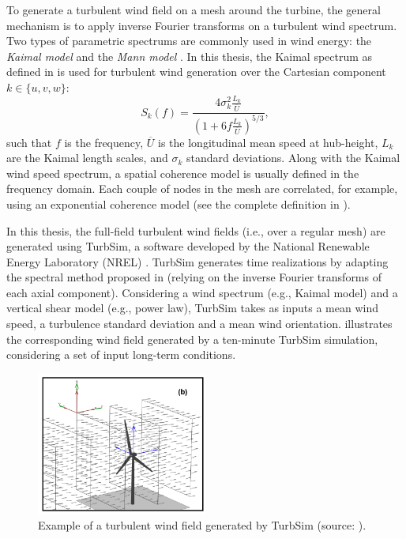 To generate a turbulent wind field on a mesh around the turbine, the general mechanism is to apply inverse Fourier transforms on a turbulent wind spectrum.  
Two types of parametric spectrums are commonly used in wind energy: the \textit{Kaimal model} \citep{kaimal_1972} and the \textit{Mann model} \citep{mann_1998}. 
In this thesis, the Kaimal spectrum as defined in \cite{iec_2019} is used for turbulent wind generation over the Cartesian component $k \in \{u, v, w\}$:
\begin{equation}
    S_k(f) = \frac{4 \sigma_k^2 \frac{L_k}{\overline{U}}}{\left(1 + 6 f \frac{L_k}{\overline{U}}\right)^{5/3}},
    \label{eq:kaimal}
\end{equation} 
such that $f$ is the frequency, $\overline{U}$ is the longitudinal mean speed at hub-height, $L_k$ are the Kaimal length scales, and $\sigma_k$ standard deviations. 
Along with the Kaimal wind speed spectrum, a spatial coherence model is usually defined in the frequency domain. 
Each couple of nodes in the mesh are correlated, for example, using an exponential coherence model (see the complete definition in \citealp[Apepndix C]{iec_2019}).

In this thesis, the full-field turbulent wind fields (i.e., over a regular mesh) are generated using TurbSim, a software developed by the National Renewable Energy Laboratory (NREL) \citep{turbsim_2009}. 
TurbSim generates time realizations by adapting the spectral method proposed in \citet{veers_1988_sandia} (relying on the inverse Fourier transforms of each axial component).   
Considering a wind spectrum (e.g., Kaimal model) and a vertical shear model (e.g., power law), TurbSim takes as inputs a mean wind speed, a turbulence standard deviation and a mean wind orientation. 
 illustrates the corresponding wind field generated by a ten-minute TurbSim simulation, considering a set of input long-term conditions. 

\begin{figure}
    \centering
    \includegraphics[width=0.5\textwidth]{./part1/figures/turbsim.png}
    \caption{Example of a turbulent wind field generated by TurbSim (source: \citealp{turbsim_2009}).}
    \label{fig:turbsim_simu}
\end{figure}

